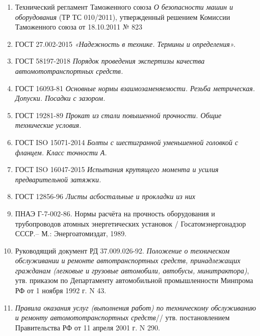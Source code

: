 \begin{enumerate}
%
\item 
Технический регламент Таможенного союза \emph{О безопасности машин и оборудования} (ТР ТС 010/2011), утвержденный решением Комиссии Таможенного союза от 18.10.2011 № 823
%
\item 
ГОСТ 27.002-2015  \emph{«Надежность в технике. Термины и определения».}
\item 
ГОСТ 58197-2018 \emph{Порядок проведения экспертизы качества автомототранспортных средств.}
\item 
ГОСТ 16093-81 \emph{Основные нормы взаимозаменяемости. Резьба метрическая. Допуски. Посадки с зазором.}
\item 
ГОСТ 19281-89 \emph{Прокат из стали повышенной прочности. Общие технические
условия.}
\item 
ГОСТ ISO 15071-2014 \emph{Болты с шестигранной уменьшенной головкой с фланцем. Класс точности А.}
\item 
ГОСТ ISO 16047-2015 \emph{Испытания крутящего момента и усилия предварительной затяжки.}
\item 
ГОСТ 12856-96 \emph{Листы асбостальные и прокладки из них}
\item 
ПНАЭ Г-7-002-86. Нормы расчёта на прочность оборудования и трубопроводов атомных
энергетических установок  / Госатомэнергонадзор СССР.– М.:
Энергоатомиздат, 1989.
\item 
Руководящий документ РД 37.009.026-92. \emph{Положение о техническом обслуживании и ремонте автотранспортных средств, принадлежащих гражданам (легковые и грузовые автомобили, автобусы, минитрактора)}, утв. приказом по Департаменту автомобильной промышленности Минпрома РФ от 1 ноября 1992 г. N 43.
%
\item \emph
{Правила оказания услуг (выполнения работ) по техническому обслуживанию и ремонту автомототранспортных средств}// утв. постановлением Правительства РФ от 11 апреля 2001 г. N 290.


\end{enumerate}
